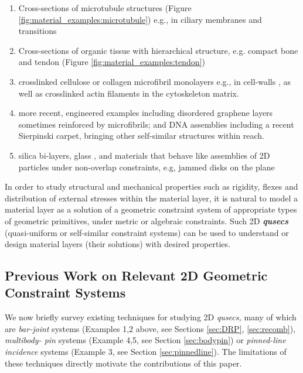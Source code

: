\begin{enumerate}
    \item Cross-sections of microtubule structures (Figure \ref{fig:material_examples:microtubule}) \cite{Necklace1} e.g., in ciliary membranes and transitions \cite{Necklace2}

    \item Cross-sections of organic tissue with hierarchical structure, e.g. compact bone and tendon (Figure \ref{fig:material_examples:tendon}) \cite{XX}

    \item crosslinked cellulose or collagen microfibril monolayers e.g., in cell-walls \cite{CellWalls1} \cite{CellWalls1}, as well as crosslinked actin filaments in the cytoskeleton matrix.

    \item more recent, engineered examples including  disordered graphene layers \cite{Graphene1} \cite{Graphene2} sometimes reinforced by  microfibrils; and DNA assemblies \cite{Microfibrils1} including a recent Sierpinski carpet, bringing other self-similar structures \cite{Microfibrils2} within reach.

    \item  silica bi-layers, glass \cite{SilicaGlass1} \cite{SilicaGlass2}, and materials that behave like assemblies of 2D particles under non-overlap constraints, e.g, jammed disks on the plane \cite{JammedDisk1}
\end{enumerate}
%
In order to study structural and mechanical properties such as
rigidity, flexes and distribution of external stresses within the
material layer, it is natural to model a material layer as a solution
of a geometric constraint system of appropriate types of geometric
primitives, under metric or algebraic constraints. Such  2D {\bf{\em
qusecs}} (quasi-uniform or self-similar constraint systems) can be
used to understand or design material layers (their solutions) with
desired properties.
%
\subsection{Previous Work on Relevant 2D Geometric Constraint Systems}
We now briefly survey existing techniques for studying 2D {\em
qusecs,}  many of which are {\it bar-joint} systems (Examples 1,2
above, see Sections \ref{sec:DRP}, \ref{sec:recomb}), {\it multibody-
pin} systems (Example 4,5, see Section \ref{sec:bodypin}) or  {\it
pinned-line incidence} systems (Example 3, see Section
\ref{sec:pinnedline}). The limitations of these techniques directly
motivate the contributions of this paper.


